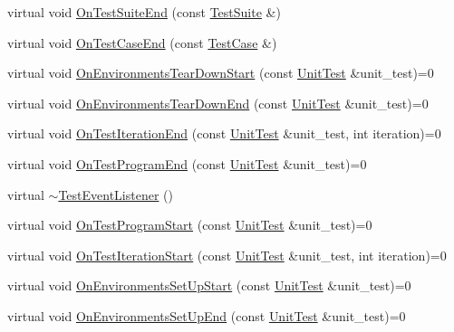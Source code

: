 \begin{DoxyCompactItemize}
\item 
virtual void \mbox{\hyperlink{classtesting_1_1_test_event_listener_a8962caad5d2522c9160c794074a662ee}{On\+Test\+Suite\+End}} (const \mbox{\hyperlink{classtesting_1_1_test_suite}{Test\+Suite}} \&)
\item 
virtual void \mbox{\hyperlink{classtesting_1_1_test_event_listener_a6cada1572dde8010b94f6dd237ce52f4}{On\+Test\+Case\+End}} (const \mbox{\hyperlink{classtesting_1_1_test_case}{Test\+Case}} \&)
\item 
virtual void \mbox{\hyperlink{classtesting_1_1_test_event_listener_a468b5e6701bcb86cb2c956caadbba5e4}{On\+Environments\+Tear\+Down\+Start}} (const \mbox{\hyperlink{classtesting_1_1_unit_test}{Unit\+Test}} \&unit\+\_\+test)=0
\item 
virtual void \mbox{\hyperlink{classtesting_1_1_test_event_listener_a9ea04fa7f447865ba76df35e12ba2092}{On\+Environments\+Tear\+Down\+End}} (const \mbox{\hyperlink{classtesting_1_1_unit_test}{Unit\+Test}} \&unit\+\_\+test)=0
\item 
virtual void \mbox{\hyperlink{classtesting_1_1_test_event_listener_a550fdb3e55726e4cefa09f5697941425}{On\+Test\+Iteration\+End}} (const \mbox{\hyperlink{classtesting_1_1_unit_test}{Unit\+Test}} \&unit\+\_\+test, int iteration)=0
\item 
virtual void \mbox{\hyperlink{classtesting_1_1_test_event_listener_ad15b6246d94c268e233487a86463ef3d}{On\+Test\+Program\+End}} (const \mbox{\hyperlink{classtesting_1_1_unit_test}{Unit\+Test}} \&unit\+\_\+test)=0
\item 
virtual \mbox{\hyperlink{classtesting_1_1_test_event_listener_a4512d19e7a108ec4926239ec1ea85d63}{$\sim$\+Test\+Event\+Listener}} ()
\item 
virtual void \mbox{\hyperlink{classtesting_1_1_test_event_listener_a5f6c84f39851e8a603a2d2e10063816b}{On\+Test\+Program\+Start}} (const \mbox{\hyperlink{classtesting_1_1_unit_test}{Unit\+Test}} \&unit\+\_\+test)=0
\item 
virtual void \mbox{\hyperlink{classtesting_1_1_test_event_listener_a60cc09b7907cb329d152eb5e7133bdeb}{On\+Test\+Iteration\+Start}} (const \mbox{\hyperlink{classtesting_1_1_unit_test}{Unit\+Test}} \&unit\+\_\+test, int iteration)=0
\item 
virtual void \mbox{\hyperlink{classtesting_1_1_test_event_listener_aa6502e534919605be45f26a6daf9a40c}{On\+Environments\+Set\+Up\+Start}} (const \mbox{\hyperlink{classtesting_1_1_unit_test}{Unit\+Test}} \&unit\+\_\+test)=0
\item 
virtual void \mbox{\hyperlink{classtesting_1_1_test_event_listener_aaa1021d75f5dbf3f05c829c1cc520341}{On\+Environments\+Set\+Up\+End}} (const \mbox{\hyperlink{classtesting_1_1_unit_test}{Unit\+Test}} \&unit\+\_\+test)=0

\end{DoxyCompactItemize}
